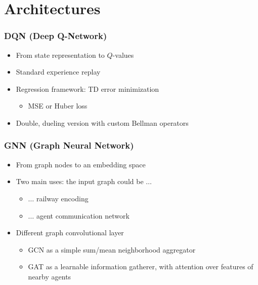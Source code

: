 \documentclass{beamer}
\begin{document}
\section{Architectures}
\begin{frame}
	\frametitle{DQN (Deep Q-Network)}
	\begin{itemize}
		\item From state representation to $Q$-values
		\item Standard experience replay
		\item Regression framework: TD error minimization
		\begin{itemize}
			\item MSE or Huber loss
		\end{itemize}
		\item Double, dueling version with custom Bellman operators
	\end{itemize}
\end{frame}

\begin{frame}
	\frametitle{GNN (Graph Neural Network)}
	\begin{itemize}
		\item From graph nodes to an embedding space
		\item Two main uses: the input graph could be $\dots$
		\begin{itemize}
			\item $\dots$ railway encoding
			\item $\dots$ agent communication network
		\end{itemize}
		\item Different graph convolutional layer
		\begin{itemize}
			\item GCN as a simple sum/mean neighborhood aggregator 
			\item GAT as a learnable information gatherer, with attention over features of nearby agents
		\end{itemize}
	\end{itemize}
\end{frame}
\end{document}
